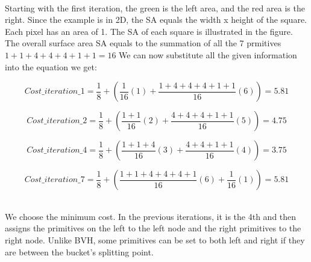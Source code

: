 \documentclass[11pt,a4paper]{article}
\begin{document}
\noindent
\\
Starting with the first iteration, the green is the left area, and the red area is the right. Since the example is in 2D, the SA equals the width x height of the square. Each pixel has an area of 1. The SA of each square is illustrated in the figure. The overall surface area SA equals to the summation of all the 7 prmitives $1+1+4+4+4+1+1 = 16$ We can now substitute all the given information into the equation we get: 


\begin{equation}
Cost\_iteration\_1 =  \frac{1}{8} + (\frac{1}{16}(1) +\frac{1+4+4+4+1+1}{16}(6)) = 5.81
\end{equation}

\begin{equation}
Cost\_iteration\_2 =  \frac{1}{8} + (\frac{1+1}{16}(2) +\frac{4+4+4+1+1}{16}(5)) = 4.75
\end{equation}

\begin{equation}
Cost\_iteration\_4 =  \frac{1}{8} + (\frac{1+1+4}{16}(3) +\frac{4+4+1+1}{16}(4)) = 3.75
\end{equation}

\begin{equation}
Cost\_iteration\_7 =  \frac{1}{8} + (\frac{1+1+4+4+4+1}{16}(6) +\frac{1}{16}(1)) = 5.81
\end{equation}

\noindent
\\
We choose the minimum cost. In the previous iterations, it is the 4th and then assigns the primitives on the left to the left node and the right primitives to the right node. Unlike BVH, some primitives can be set to both left and right if they are between the bucket's splitting point.
\end{document}

